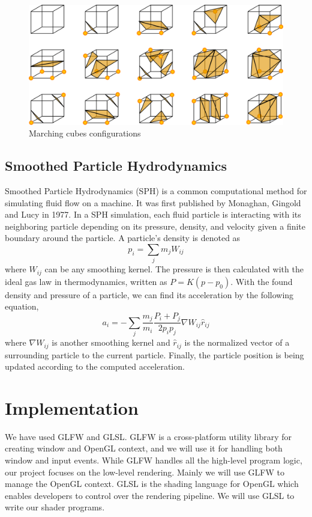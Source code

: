 \documentclass{article}
\begin{document}
\begin{multicols}{2}
			\begin{figure}[H]
				\centering
				\begin{minipage}[b]{0.4\textwidth}
					\includegraphics[width=\textwidth]{img/marching-cubes-config.png}
                    \caption{Marching cubes configurations \cite{wiki10}}
					\label{fig:marching-cubes-config}
				\end{minipage}
			\end{figure}
		
		\subsection{Smoothed Particle Hydrodynamics}
			Smoothed Particle Hydrodynamics (SPH) is a common computational method for simulating fluid flow on a machine. It was first published by Monaghan, Gingold and Lucy in 1977. In a SPH simulation, each fluid particle is interacting with its neighboring particle depending on its pressure, density, and velocity given a finite boundary around the particle. A particle's density is denoted as $$p_i=\sum_{j} m_jW_{ij}$$ where $W_{ij}$ can be any smoothing kernel. The pressure is then calculated with the ideal gas law in thermodynamics, written as $P=K(p-p_0)$. With the found density and pressure of a particle, we can find its acceleration by the following equation, $$a_i=-\sum_{j} \frac{m_j}{m_i}\frac{P_i+P_j}{2p_ip_j}\nabla W_{ij}\hat{r}_{ij}$$ where $\nabla W_{ij}$ is another smoothing kernel and $\hat{r}_{ij}$ is the normalized vector of a surrounding particle to the current particle. Finally, the particle position is being updated according to the computed acceleration. 

    \section{Implementation}

        We have used GLFW and GLSL. GLFW is a cross-platform utility library for creating window and OpenGL context, and we will use it for handling both window and input events. While GLFW handles all the high-level program logic, our project focuses on the low-level rendering. Mainly we will use GLFW to manage the OpenGL context. GLSL is the shading language for OpenGL which enables developers to control over the rendering pipeline. We will use GLSL to write our shader programs.
        

\end{multicols}
\end{document}
